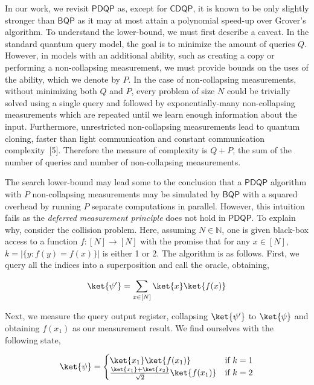 \documentclass[10pt,a4paper]{article}
\begin{document}
In our work, we revisit $\mathsf{PDQP}$ as, except for $\mathsf{CDQP}$, it is known to be only slightly stronger than $\mathsf{BQP}$ as it may at most attain a polynomial speed-up over Grover’s algorithm. To understand the lower-bound, we must first describe a caveat. In the standard quantum query model, the goal is to minimize the amount of queries $Q$. However, in models with an additional ability, such as creating a copy or performing a non-collapsing measurement, we must provide bounds on the uses of the ability, which we denote by $P$. In the case of non-collapsing measurements, without minimizing both $Q$ and $P$, every problem of size $N$ could be trivially solved using a single query and followed by exponentially-many non-collapsing measurements which are repeated until we learn enough information about the input. Furthermore, unrestricted non-collapsing measurements lead to quantum cloning, faster than light communication and constant communication complexity [5]. Therefore the measure of complexity is $Q+P$, the sum of the number of queries and number of non-collapsing measurements.\par




The search lower-bound may lead some to the conclusion that a $\mathsf{PDQP}$ algorithm with $P$ non-collapsing measurements may be simulated by $\mathsf{BQP}$ with a squared overhead by running $P$ separate computations in parallel. However, this intuition fails as the \emph{deferred measurement principle} does not hold in $\mathsf{PDQP}$. To explain why, consider the collision problem. Here, assuming $N\in\mathbb{N}$, one is given black-box access to a function $f:[N]\rightarrow[N]$ with the promise that for any $x\in[N]$, $k=|\{y:f(y)=f(x)\}|$ is either 1 or 2. The algorithm is as follows. First, we query all the indices into a superposition and call the oracle, obtaining,\par


\[\begin{gathered}
\displaystyle\ket{\psi^{\prime}}=\sum_{x\in[N]}\ket{x}\ket{f(x)}
\end{gathered}\]


Next, we measure the query output register, collapsing $\ket{\psi^{\prime}}$ to $\ket{\psi}$ and obtaining $f(x_{1})$ as our measurement result. We find ourselves with the following state,\par


\[\begin{gathered}
\displaystyle\ket{\psi}=\begin{cases}\ket{x_{1}}\ket{f(x_{1})}&\text{if }k=1\\
\frac{\ket{x_{1}}+\ket{x_{2}}}{\sqrt{2}}\ket{f(x_{1})}&\text{if }k=2\end{cases}
\end{gathered}\]
\end{document}
